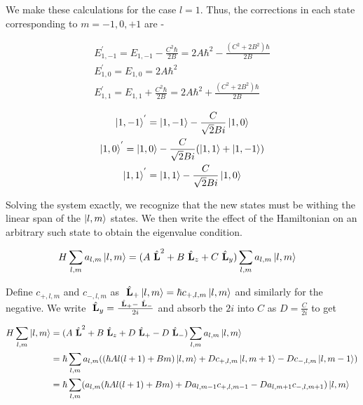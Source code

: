     We make these calculations for the case $l = 1$. Thus, the corrections in each state corresponding to $m = -1, 0, +1$ are -

    \begin{gather*}
        E^{'}_{1,-1} = E_{1,-1} - \frac{C^2\hbar}{2B} = 2A\hbar^2 - \frac{(C^2 + 2B^2)\hbar}{2B}\\
        E^{'}_{1,0} = E_{1,0} = 2A\hbar^2\\
        E^{'}_{1,1} = E_{1,1} + \frac{C^2\hbar}{2B} = 2A\hbar^2 + \frac{(C^2 + 2B^2)\hbar}{2B}
    \end{gather*}

    \begin{gather*}
        \ket{1,-1}^{'} = \ket{1,-1} - \frac{C}{\sqrt{2}Bi}\ket{1,0} \\
        \ket{1,0}^{'} = \ket{1,0} - \frac{C}{\sqrt{2}Bi}(\ket{1,1} + \ket{1,-1})\\
        \ket{1,1}^{'} = \ket{1,1} - \frac{C}{\sqrt{2}Bi}\ket{1,0} 
    \end{gather*}



Solving the system exactly, we recognize that the new states must be withing the
linear span of the $\ket{l, m}$ states. We then write the effect of the
Hamiltonian on an arbitrary such state to obtain the eigenvalue condition.

\begin{align}
    H \sum_{l, m}a_{l, m}\ket{l, m} &= (A ~\hat{\textbf{L}}^2 + B~\hat{\textbf{L}}_z + C~\hat{\textbf{L}}_y) \sum_{l, m}a_{l, m}\ket{l, m}
\end{align}

Define $c_{+, l,m}$ and $c_{-, l,m}$ as $~\hat{\textbf{L}}_+ \ket{l, m} = \hbar c_{+,
l,m} \ket{l, m}$ and similarly for the negative. We write $~\hat{\textbf{L}}_y =
\frac{~\hat{\textbf{L}}_+ - ~\hat{\textbf{L}}_-}{2i}$ and absorb the $2i$ into
$C$ as $D = \frac{C}{2i}$ to get

\begin{align}
    H \sum_{l, m}\ket{l, m} &= 
    (A ~\hat{\textbf{L}}^2 + B~\hat{\textbf{L}}_z + 
    D~\hat{\textbf{L}}_+ - D~\hat{\textbf{L}}_-) \sum_{l, m}a_{l, m}\ket{l, m}\nonumber\\
    &= \hbar \sum_{l, m}a_{l, m}((\hbar A l(l+1) + Bm)\ket{l, m} + Dc_{+, l,m}\ket{l, m+1} - Dc_{-, l,m}\ket{l, m-1}) \nonumber\\
    &= \hbar \sum_{l, m}(a_{l, m}(\hbar A l(l+1) + Bm) + Da_{l, m-1}c_{+, l,m-1} - Da_{l, m+1}c_{-, l,m+1})\ket{l, m} \\
\end{align}

